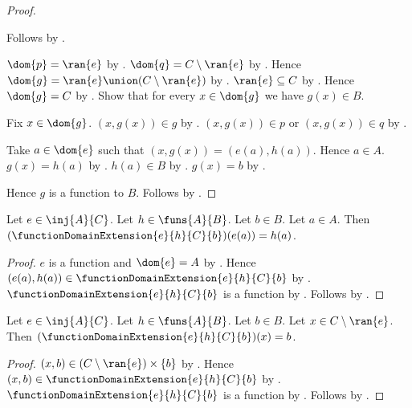 \begin{proof}
\begin{subproof}
        Follows by .
    \end{subproof}
    $\dom{p}=\ran{e}$
        by .
    $\dom{q}=C\setminus\ran{e}$
        by
        .
    Hence $\dom{g}=\ran{e}\union(C\setminus\ran{e})$
        by .
    $\ran{e}\subseteq C$ by .
    Hence $\dom{g}=C$ by .
    Show that for every $x\in\dom{g}$ we have $g(x)\in B$.
    \begin{subproof}
        Fix $x\in\dom{g}$.
        $(x,g(x))\in g$ by .
        $(x,g(x))\in p$ or $(x,g(x))\in q$ by .
        \begin{byCase}
                Take $a\in\dom{e}$ such that
                    $(x,g(x))=(e(a),h(a))$.
                Hence $a\in A$.
                $g(x)=h(a)$ by .
                $h(a)\in B$ by .
                $g(x)=b$ by .
        \end{byCase}
    \end{subproof}
    Hence $g$ is a function to $B$.
    Follows by .
\end{proof}

\begin{proposition}\label{function_domain_extension_on_range}
    Let $e\in\inj{A}{C}$.
    Let $h\in\funs{A}{B}$.
    Let $b\in B$.
    Let $a\in A$.
    Then $(\functionDomainExtension{e}{h}{C}{b})(e(a))=h(a)$.
\end{proposition}
\begin{proof}
    $e$ is a function and $\dom{e}=A$ by .
    Hence $(e(a),h(a))\in\functionDomainExtension{e}{h}{C}{b}$
        by .
    $\functionDomainExtension{e}{h}{C}{b}$ is a function
        by .
    Follows by .
\end{proof}

\begin{proposition}\label{function_domain_extension_off_range}
    Let $e\in\inj{A}{C}$.
    Let $h\in\funs{A}{B}$.
    Let $b\in B$.
    Let $x\in C\setminus\ran{e}$.
    Then $(\functionDomainExtension{e}{h}{C}{b})(x)=b$.
\end{proposition}
\begin{proof}
    $(x,b)\in(C\setminus\ran{e})\times\{b\}$
        by .
    Hence $(x,b)\in\functionDomainExtension{e}{h}{C}{b}$
        by .
    $\functionDomainExtension{e}{h}{C}{b}$ is a function
        by .
    Follows by .
\end{proof}

